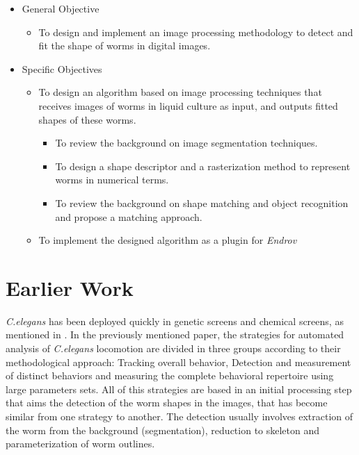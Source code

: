 \begin{itemize}
\item General Objective
  \begin{itemize}
  \item To design and implement an image processing methodology to detect
    and fit the shape of worms in digital images.    
  \end{itemize}
\end{itemize}
\begin{itemize}
\item Specific Objectives
  \begin{itemize}
  \item To design an algorithm based on image processing techniques that
    receives images of worms in liquid culture as input, and outputs
    fitted shapes of these worms.
    \begin{itemize}
    \item To review the background on image segmentation techniques.    
    \item To design a shape descriptor and a rasterization method to
      represent worms in numerical terms.
    \item To review the background on shape matching and object recognition and
      propose a matching approach.    
    \end{itemize}
  \item To implement the designed algorithm as a plugin for \emph{Endrov}
  \end{itemize}
\end{itemize}

\section{Earlier Work}

\emph{C.elegans} has been deployed quickly in genetic screens and chemical
screens, as mentioned in \cite{automated}. In the previously mentioned paper,
the strategies for automated analysis of \emph{C.elegans} locomotion are
divided in three groups according to their methodological approach:
Tracking overall behavior, Detection and measurement of distinct behaviors and
measuring the complete behavioral repertoire using large parameters sets.
All of this strategies are based in an initial processing step that aims 
the detection of the worm shapes in the images, that has become similar
from one strategy to another. The detection usually involves extraction
of the worm from the background (segmentation), reduction to
skeleton and parameterization of worm outlines.\\


